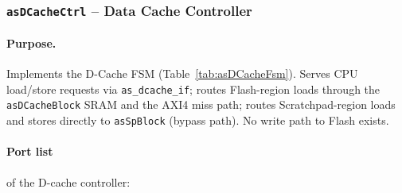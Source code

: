 

\subsubsection{\texttt{asDCacheCtrl} -- Data Cache Controller}
\label{subsubsec:asDCacheCtrl}

\paragraph{Purpose.}
Implements the D-Cache FSM (Table~\ref{tab:asDCacheFsm}).
Serves CPU load/store requests via \texttt{as\_dcache\_if};
routes Flash-region loads through the \texttt{asDCacheBlock} SRAM and
the AXI4 miss path; routes Scratchpad-region loads and stores directly
to \texttt{asSpBlock} (bypass path).
No write path to Flash exists.

\paragraph{Port list} of the D-cache controller:

